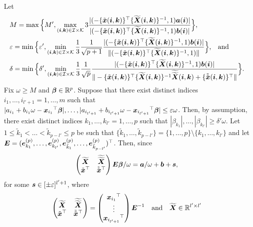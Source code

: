 \documentclass[12pt]{article}
\def\ep{{\varepsilon}}
\def\be{{\beta}}
\def\de{{\delta}}
\def\ep{{\varepsilon}}
\def\om{{\omega}}
\def\non{{\nonumber}}
\def\Ic{{\cal I}}
\def\Kc{{\cal K}}
\def\be{{\beta}}
\def\de{{\delta}}
\def\ep{{\varepsilon}}
\def\om{{\omega}}
\def\bbe{{\text{\boldmath $\beta$}}}
\def\a{{\text{\boldmath $a$}}}
\def\b{{\text{\boldmath $b$}}}
\def\e{{\text{\boldmath $e$}}}
\def\i{{\text{\boldmath $i$}}}
\def\k{{\text{\boldmath $k$}}}
\def\s{{\text{\boldmath $s$}}}
\def\x{{\text{\boldmath $x$}}}
\def\E{{\text{\boldmath $E$}}}
\def\X{{\text{\boldmath $X$}}}
\def\xbt{{\tilde \x}}
\def\kt{{\tilde k}}
\def\Xbt{{\widetilde \X}}
\def\Ic{{\cal I}}
\def\Kc{{\cal K}}
\def\non{{\nonumber}}
\begin{document}
Let 
\begin{align}
&M = \max \Big\{ M' , \max_{( \i , \k ) \in \Ic \times \Kc } 3 {|(- \{ \xbt ( \i , \k ) \} ^{\top } \{ \Xbt ( \i , \k ) \} ^{- 1} , 1) \a ( \i )| \over |(- \{ \xbt ( \i , \k ) \} ^{\top } \{ \Xbt ( \i , \k ) \} ^{- 1} , 1) \b ( \i )|} \Big\} \text{,} \non \\
&\ep = \min \Big\{ {\ep }' , \min_{( \i , \k ) \in \Ic \times \Kc } {1 \over 3} {1 \over \sqrt{p + 1}} {|(- \{ \xbt ( \i , \k ) \} ^{\top } \{ \Xbt ( \i , \k ) \} ^{- 1} , 1) \b ( \i )| \over \| (- \{ \xbt ( \i , \k ) \} ^{\top } \{ \Xbt ( \i , \k ) \} ^{- 1} , 1) \| } \Big\} \text{,} \quad \text{and} \non \\
&\de = \min \Big\{ {\de }' , \min_{( \i , \k ) \in \Ic \times \Kc } {1 \over 3} {1 \over \sqrt{p}} {|(- \{ \xbt ( \i , \k ) \} ^{\top } \{ \Xbt ( \i , \k ) \} ^{- 1} , 1) \b ( \i )| \over \| - \{ \xbt ( \i , \k ) \} ^{\top } \{ \Xbt ( \i , \k ) \} ^{- 1} \widetilde{\Xbt } ( \i , \k ) + \{ \tilde{\xbt } ( \i , \k ) \} ^{\top } \| } \Big\} \text{.} \non 
\end{align}
Fix $\om \ge M$ and $\bbe \in \mathbb{R} ^p$. 
Suppose that there exist distinct indices $i_1 , \dots , i_{l' + 1} = 1, \dots , m$ such that $| a_{i_1} + b_{i_1} \om - {\x _{i_1}}^{\top } \bbe |, \dots , | a_{i_{l' + 1}} + b_{i_{l' + 1}} \om - {\x _{i_{l' + 1}}}^{\top } \bbe | \le \ep \om $. 
Then, by assumption, there exist distinct indices $k_1 , \dots , k_{l'} = 1, \dots , p$ such that $| \be _{k_1} |, \dots , | \be _{k_{l'}} | \ge {\de }' \om $. 
Let $1 \le \kt _1 < \dots < \kt _{p - l'} \le p$ be such that $\{ \kt _1 , \dots , \kt _{p - l'} \} = \{ 1, \dots , p \} \setminus \{ k_1 , \dots , k_{l'} \} $ and let $\E = ( \e _{k_1}^{(p)} , \dots ,  \e _{k_{l'}}^{(p)} ,  \e _{\kt _1}^{(p)} , \dots ,  \e _{\kt _{p - l'}}^{(p)} )^{\top }$. 
Then, since 
\begin{align}
\begin{pmatrix} \Xbt & \widetilde{\Xbt } \\ \xbt ^{\top } & \tilde{\xbt } ^{\top } \end{pmatrix} \E \bbe / \om = \a / \om + \b + \s \text{,} \non 
\end{align}
for some $\s \in [ \pm \ep ]^{l' + 1}$, 
where 
\begin{align}
\begin{pmatrix} \Xbt & \widetilde{\Xbt } \\ \xbt ^{\top } & \tilde{\xbt } ^{\top } \end{pmatrix} = \begin{pmatrix} {\x _{i_1}}^{\top } \\ \vdots \\ {\x _{i_{l' + 1}}}^{\top } \end{pmatrix} \E ^{- 1} \quad \text{and} \quad \Xbt \in \mathbb{R} ^{l' \times l'} \non 
\end{align}
\end{document}
